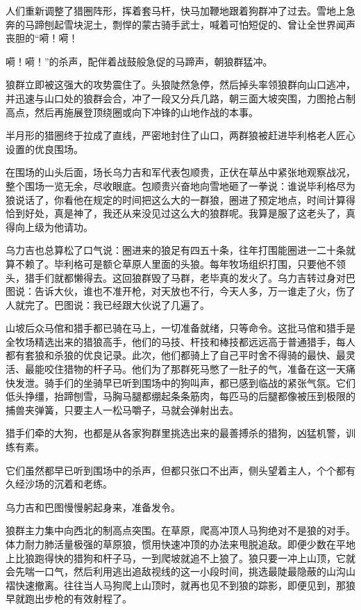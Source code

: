 \par 人们重新调整了猎圈阵形，挥着套马杆，快马加鞭地跟着狗群冲了过去。雪地上急奔的马蹄刨起雪块泥土，剽悍的蒙古骑手武士，喊着可怕短促的、曾让全世界闻声丧胆的“嗬！嗬！
\par 嗬！嗬！”的杀声，配伴着战鼓般急促的马蹄声，朝狼群猛冲。
\par 狼群立即被这强大的攻势震住了。头狼陡然急停，然后掉头率领狼群向山口逃冲，并迅速与山口处的狼群会合，冲了一段又分兵几路，朝三面大坡突围，力图抢占制高点，然后再施展登顶绕圈或向下冲锋的山地作战的本事。
\par 半月形的猎圈终于拉成了直线，严密地封住了山口，两群狼被赶进毕利格老人匠心设置的优良围场。
\par 
\par 在围场的山头后面，场长乌力吉和军代表包顺贵，正伏在草丛中紧张地观察战况，整个围场一览无余，尽收眼底。包顺贵兴奋地向雪地砸了一拳说：谁说毕利格尽为狼说话了，你看他在规定的时间把这么大的一群狼，圈进了预定地点，时间计算得恰到好处，真是神了，我还从来没见过这么大的狼群呢。我算是服了这老头了，真得向上级为他请功。
\par 乌力吉也总算松了口气说：圈进来的狼足有四五十条，往年打围能圈进一二十条就算不赖了。毕利格可是额仑草原人里面的头狼。每年牧场组织打围，只要他不领头，猎手们就都懒得去。这回狼群毁了马群，老毕真的发火了。乌力吉转过身对巴图说：告诉大伙，谁也不准开枪，对天放也不行，今天人多，万一谁走了火，伤了人就完了。巴图说：我已经跟大伙说了几遍了。
\par 山坡后众马倌和猎手都已骑在马上，一切准备就绪，只等命令。这批马倌和猎手是全牧场精选出来的猎狼高手，他们的马技、杆技和棒技都远远高于普通猎手，每人都有套狼和杀狼的优良记录。此次，他们都骑上了自己平时舍不得骑的最快、最灵活、最能咬住猎物的杆子马。他们为了那群死马憋了一肚子的气，准备在这一天痛快发泄。骑手们的坐骑早已听到围场中的狗叫声，都已感到临战的紧张气氛。它们低头挣缰，抬蹄刨雪，马胸马腿都绷起条条筋肉，每匹马的后腿都像被压到极限的捕兽夹弹簧，只要主人一松马嚼子，马就会弹射出去。
\par 猎手们牵的大狗，也都是从各家狗群里挑选出来的最善搏杀的猎狗，凶猛机警，训练有素。
\par 它们虽然都早已听到围场中的杀声，但都只张口不出声，侧头望着主人，个个都有久经沙场的沉着和老练。
\par 乌力吉和巴图慢慢躬起身来，准备发令。
\par 狼群主力集中向西北的制高点突围。在草原，爬高冲顶人马狗绝对不是狼的对手。体力耐力肺活量极强的草原狼，惯用快速冲顶的办法来甩脱追敌。即便少数在平地上比狼跑得快的猎狗和杆子马，一到爬坡就追不上狼了。狼只要一冲上山顶，它就会先喘一口气，然后利用逃出追敌视线的这一小段时间，挑选最陡最隐蔽的山沟山褶快速撤离。往往当人马狗爬上山顶时，就再也见不到狼的踪影，即便见到，那狼早就跑出步枪的有效射程了。
